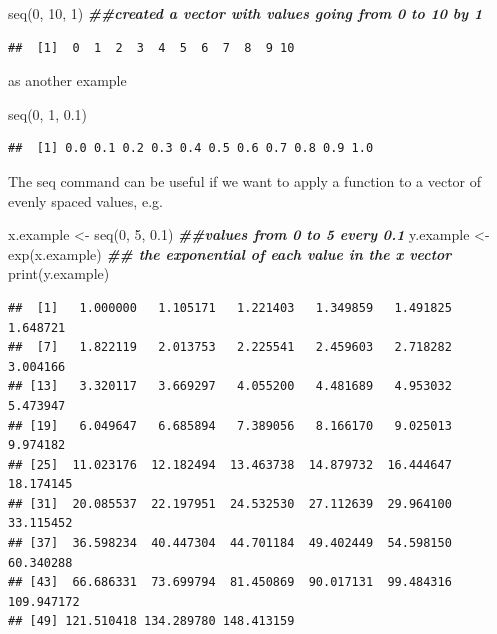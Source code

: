 \documentclass[
]{book}
\newenvironment{Shaded}{\begin{snugshade}}{\end{snugshade}}
\newcommand{\DecValTok}[1]{\textcolor[rgb]{0.00,0.00,0.81}{#1}}
\newcommand{\DocumentationTok}[1]{\textcolor[rgb]{0.56,0.35,0.01}{\textbf{\textit{#1}}}}
\newcommand{\FloatTok}[1]{\textcolor[rgb]{0.00,0.00,0.81}{#1}}
\newcommand{\FunctionTok}[1]{\textcolor[rgb]{0.00,0.00,0.00}{#1}}
\newcommand{\NormalTok}[1]{#1}
\newcommand{\OtherTok}[1]{\textcolor[rgb]{0.56,0.35,0.01}{#1}}
\theoremstyle{definition}
\theoremstyle{definition}
\theoremstyle{definition}
\theoremstyle{definition}
\theoremstyle{remark}
\begin{document}
\begin{Shaded}
\begin{Highlighting}[]
\FunctionTok{seq}\NormalTok{(}\DecValTok{0}\NormalTok{, }\DecValTok{10}\NormalTok{, }\DecValTok{1}\NormalTok{)  }\DocumentationTok{\#\#created a vector with values going from 0 to 10 by 1}
\end{Highlighting}
\end{Shaded}

\begin{verbatim}
##  [1]  0  1  2  3  4  5  6  7  8  9 10
\end{verbatim}

as another example

\begin{Shaded}
\begin{Highlighting}[]
\FunctionTok{seq}\NormalTok{(}\DecValTok{0}\NormalTok{, }\DecValTok{1}\NormalTok{, }\FloatTok{0.1}\NormalTok{)}
\end{Highlighting}
\end{Shaded}

\begin{verbatim}
##  [1] 0.0 0.1 0.2 0.3 0.4 0.5 0.6 0.7 0.8 0.9 1.0
\end{verbatim}

The seq command can be useful if we want to apply a function to a vector of evenly spaced values, e.g.

\begin{Shaded}
\begin{Highlighting}[]
\NormalTok{x.example }\OtherTok{\textless{}{-}} \FunctionTok{seq}\NormalTok{(}\DecValTok{0}\NormalTok{, }\DecValTok{5}\NormalTok{, }\FloatTok{0.1}\NormalTok{)  }\DocumentationTok{\#\#values from 0 to 5 every 0.1}
\NormalTok{y.example }\OtherTok{\textless{}{-}} \FunctionTok{exp}\NormalTok{(x.example)  }\DocumentationTok{\#\# the exponential of each value in the x vector}
\FunctionTok{print}\NormalTok{(y.example)}
\end{Highlighting}
\end{Shaded}

\begin{verbatim}
##  [1]   1.000000   1.105171   1.221403   1.349859   1.491825   1.648721
##  [7]   1.822119   2.013753   2.225541   2.459603   2.718282   3.004166
## [13]   3.320117   3.669297   4.055200   4.481689   4.953032   5.473947
## [19]   6.049647   6.685894   7.389056   8.166170   9.025013   9.974182
## [25]  11.023176  12.182494  13.463738  14.879732  16.444647  18.174145
## [31]  20.085537  22.197951  24.532530  27.112639  29.964100  33.115452
## [37]  36.598234  40.447304  44.701184  49.402449  54.598150  60.340288
## [43]  66.686331  73.699794  81.450869  90.017131  99.484316 109.947172
## [49] 121.510418 134.289780 148.413159
\end{verbatim}
\end{document}
